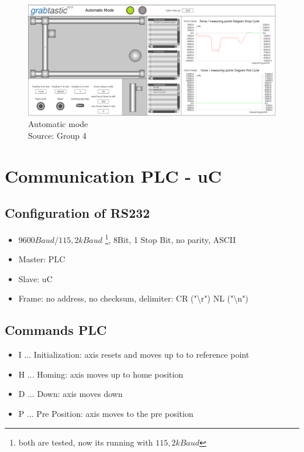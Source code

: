 \documentclass[a4paper,12pt]{scrreprt}
\begin{document}
\begin{figure}[H]
  \centering
   \includegraphics[width=1\textwidth]{pictures/automaitk_mode}
   \caption[Automatic mode]{Automatic mode\\
	Source: Group 4}
   \label{fig:automatic mode}
\end{figure} 

\chapter{Communication \acs{PLC} - \acs{uC}}

\section{Configuration of \acs{RS232}}\label{sec: config of rs232}

\begin{itemize}
\item $9600 Baud$/$115,2kBaud$ \footnote{both are tested, now its running with $115,2kBaud$}, 8Bit, 1 Stop Bit, no parity, ASCII
\item Master: \acs{PLC}
\item Slave: \acs{uC}
\item Frame: no address, no checksum, delimiter: CR ("\textbackslash r") NL ("\textbackslash n")
\end{itemize}

\section{Commands \acs{PLC}}
\begin{itemize}
\item \acs{I} ... Initialization: axis resets and moves up to to reference point
\item \acs{H} ... Homing: axis moves up to home position
\item \acs{D} ... Down: axis moves down
\item \acs{P} ... Pre Position: axis moves to the pre position
\end{itemize}
\end{document}
